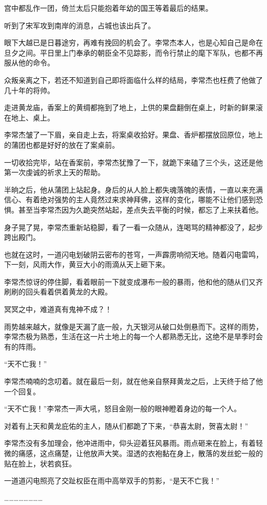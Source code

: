 宫中都乱作一团，倚兰太后只能抱着年幼的国王等着最后的结果。

听到了宋军攻到南岸的消息，占城也该出兵了。

眼下大越已是日暮途穷，再难有挽回的机会了。李常杰本人，也是心知自己是命在旦夕之间。平日里上门奉承的朝臣全不见踪影，而令行禁止的麾下军队，也都不再服从他的命令。

众叛亲离之下，若还不知道到自己即将面临什么样的结局，李常杰也枉费了他做了几十年的将帅。

走进黄龙庙，香案上的黄绸都拖到了地上，上供的果盘翻倒在桌上，时新的鲜果滚在地上、桌上。

李常杰皱了一下眉，亲自走上去，将案桌收拾好。果盘、香炉都摆放回原位，地上的蒲团也都是好好的放在了案桌前。

一切收拾完毕，站在香案前，李常杰犹豫了一下，就跪下来磕了三个头，这还是他第一次虔诚的祈求上天的帮助。

半晌之后，他从蒲团上站起身。身后的从人脸上都失魂落魄的表情，一直以来充满信心、有着绝对强势的主人竟然过来求神拜佛，这样的变化，哪能不让他们感到恐惧。甚至当李常杰因为久跪突然站起，差点失去平衡的时候，都忘了上来扶着他。

身子晃了晃，李常杰重新站稳脚，看了一看一众随从，连喝骂的精神都没了，起步跨出殿门。

也就在这时，一道闪电划破阴云密布的苍穹，一声霹雳响彻天地。随着闪电雷鸣，下一刻，风雨大作，黄豆大小的雨滴从天上砸下来。

李常杰惊讶的停住脚，看着眼前一下就变成瀑布一般的暴雨，他和他的随从们又齐刷刷的回头看着供着黄龙的大殿。

冥冥之中，难道真有鬼神不成？！

雨势越来越大，就像是天漏了底一般，九天银河从破口处倒悬而下。这样的雨势，李常杰极为熟悉，生活在这一片土地上的每一个人都熟悉无比，这绝不是旱季时会有的阵雨。

“天不亡我！”

李常杰喃喃的念叨着。就在最后一刻，就在他亲自祭拜黄龙之后，上天终于给了他一个回复。

“天不亡我！”李常杰一声大吼，怒目金刚一般的眼神瞪着身边的每一个人。

对着有上天和黄龙庇佑的主人，随从们都跪了下来，“恭喜太尉，贺喜太尉！”

李常杰没有多加理会，他冲进雨中，仰头迎着狂风暴雨。雨点砸来在脸上，有着轻微的痛感，这点痛楚，让他放声大笑。湿透的衣袍黏在身上，散落的发丝蛇一般的贴在脸上，状若疯狂。

一道道闪电照亮了交趾权臣在雨中高举双手的剪影，“是天不亡我！”

……………………

